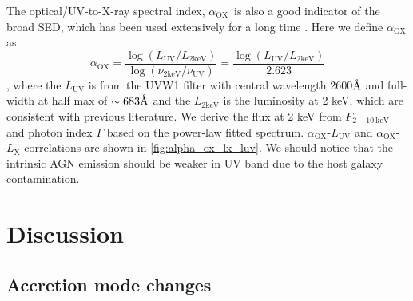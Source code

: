 \documentclass[twocolumn]{aastex63}
\newcommand{\alphaox}{$\alpha_\mathrm{OX}$}
\newcommand{\angstrom}{\text{\normalfont\AA}}
\begin{document}
 The optical/UV-to-X-ray spectral index, \alphaox\, is also a good indicator of the broad SED, which has been used extensively for a long time \citep[e.g.][]{1979ApJ...234L...9T}. Here we define \alphaox\, as 
\begin{equation}
\alpha_\mathrm{OX} = \frac{\log (L_\mathrm{UV} / L_\mathrm{2keV} )} {\log (\nu_\mathrm{2keV} /  \nu_\mathrm{UV} )}=\frac{\log (L_\mathrm{UV} / L_\mathrm{2keV} )}{2.623}
\label{definition_alpha_ox}
\end{equation}
, where the $L_\mathrm{UV}$ is from the UVW1 filter with central wavelength {2600{$\angstrom$}} and full-width at half max of $\sim 683\angstrom$ \citep{2008MNRAS.383..627P} and the $L_\mathrm{2keV}$ is the luminosity at 2 keV, which are consistent with previous literature. We derive the flux at 2 keV from $F_\mathrm{2-10~ keV}$ and  photon index $\Gamma$ based on the power-law fitted spectrum. \alphaox-$L_\mathrm{UV}$ and \alphaox-$L_\mathrm{X}$ correlations are shown in \autoref{fig:alpha_ox_lx_luv}. We should notice that the intrinsic AGN emission should be weaker in UV band due to the host galaxy contamination. 



\section{Discussion}\label{sec:discussion}
\subsection{Accretion mode changes}
\label{sec:spectral evolution}

\end{document}
